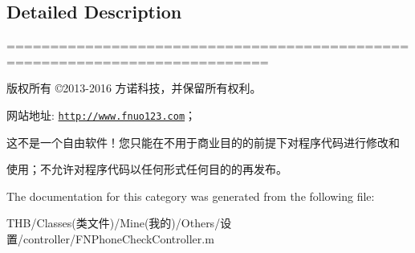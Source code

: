 \subsection{Detailed Description}
============================================================================

版权所有 ©2013-\/2016 方诺科技，并保留所有权利。

网站地址\+: \href{http://www.fnuo123.com}{\tt http\+://www.\+fnuo123.\+com}； 



这不是一个自由软件！您只能在不用于商业目的的前提下对程序代码进行修改和

使用；不允许对程序代码以任何形式任何目的的再发布。 

 

The documentation for this category was generated from the following file\+:\begin{DoxyCompactItemize}
\item 
T\+H\+B/\+Classes(类文件)/\+Mine(我的)/\+Others/设置/controller/F\+N\+Phone\+Check\+Controller.\+m\end{DoxyCompactItemize}
